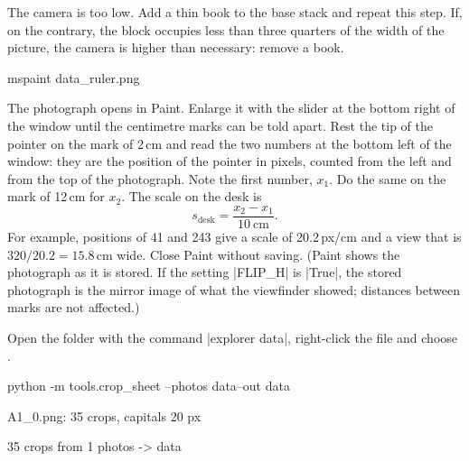 \begin{iffail}
The camera is too low. Add a thin book to the base stack and repeat this step. If, on the
contrary, the block occupies less than three quarters of the width of the picture, the camera is
higher than necessary: remove a book.
\end{iffail}

\label{st:paint}
\begin{ps}
mspaint data\raw\rig\desk_ruler.png
\end{ps}
The photograph opens in Paint. Enlarge it with the slider at the bottom right of the window
until the centimetre marks can be told apart. Rest the tip of the pointer on the mark of 2\,cm
and read the two numbers at the bottom left of the window: they are the position of the
pointer in pixels, counted from the left and from the top of the photograph. Note the first
number, $x_1$. Do the same on the mark of 12\,cm for $x_2$. The scale on the desk is
\[
  s_{\text{desk}} = \frac{x_2 - x_1}{10\ \text{cm}} .
\]
For example, positions of 41 and 243 give a scale of 20.2\,px/cm and a view that is
$320/20.2 = 15.8$\,cm wide. Close Paint without saving. (Paint shows the photograph as it is
stored. If the setting \code|FLIP_H| is \code|True|, the stored photograph is the mirror image
of what the viewfinder showed; distances between marks are not affected.)

\begin{iffail}
Open the folder with the command \code|explorer data\raw\rig|, right-click the file
 and choose \then{}.
\end{iffail}

\label{st:calcrop}
\begin{ps}
python -m tools.crop_sheet --photos data\raw\rig --out data\raw\rig\crops
\end{ps}
\begin{out}
A1_0.png: 35 crops, capitals 20 px

35 crops from 1 photos -> data\raw\rig\crops
\end{out}

